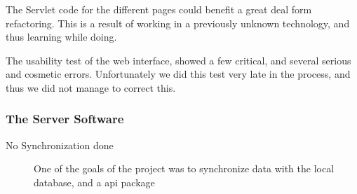The Servlet code for the different pages could benefit a great deal form refactoring. This is a result of working in a previously unknown technology, and thus learning while doing.

The usability test of the web interface, showed a few critical, and several serious and cosmetic errors. Unfortunately we did this test very late in the process, and thus we did not manage to correct this.
	

\subsubsection*{The Server Software}
\begin{description}
 \item[No Synchronization done] One of the goals of the project was to synchronize data with the local database, and a api package 
\end{description}


